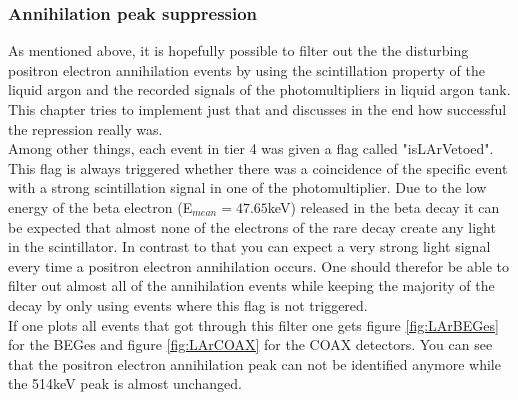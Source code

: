 \subsubsection{Annihilation peak suppression}
\label{sec:APS}

As mentioned above, it is hopefully possible to filter out the the disturbing positron electron annihilation events by using the scintillation property of the liquid argon and the recorded signals of the photomultipliers in liquid argon tank.
This chapter tries to implement just that and discusses in the end how successful the repression really was.
\\

Among other things, each event in tier 4 was given a flag called "isLArVetoed".
This flag is always triggered whether there was a coincidence of the specific event with a strong scintillation signal in one of the photomultiplier. 
Due to the low energy of the beta electron (E\(_{mean}=47.65\)keV) released in the beta decay it can be expected that almost none of the electrons of the rare  decay create any light in the scintillator. 
In contrast to that you can expect a very strong light signal every time a positron electron annihilation occurs. 
One should therefor be able to filter out almost all of the annihilation events while keeping the majority of the  decay by only using events where this flag is not triggered.
\\

If one plots all events that got through this filter one gets figure \ref{fig:LArBEGes} for the BEGes and figure \ref{fig:LArCOAX} for the COAX detectors.
You can see that the positron electron annihilation peak can not be identified anymore while the 514keV peak is almost unchanged.
\\

